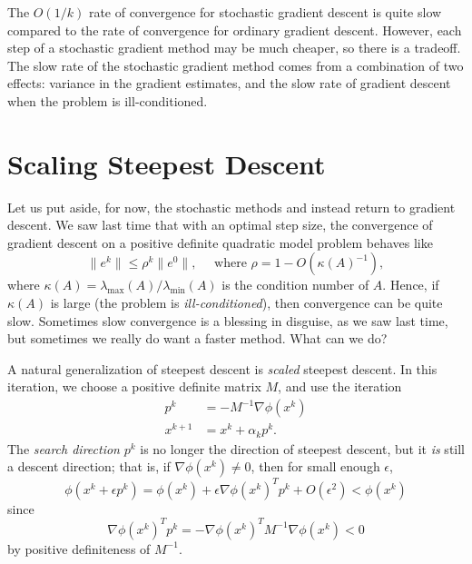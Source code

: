 \documentclass[12pt, leqno]{article} %
\begin{document}
The $O(1/k)$ rate of convergence for stochastic gradient descent is quite slow
compared to the rate of convergence for ordinary gradient descent.
However, each step of a stochastic gradient method may be much
cheaper, so there is a tradeoff.  The slow rate of the stochastic
gradient method comes from a combination of two effects: variance in
the gradient estimates, and the slow rate of gradient descent when the
problem is ill-conditioned.

\section{Scaling Steepest Descent}

Let us put aside, for now, the stochastic methods and instead
return to gradient descent.  We saw last time that with an optimal
step size, the convergence of gradient descent on a positive definite
quadratic model problem behaves like
\[
  \|e^k\| \leq \rho^k \|e^0\|, \quad \mbox{ where }
  \rho = 1 - O(\kappa(A)^{-1}),
\]
where $\kappa(A) = \lambda_{\max}(A)/\lambda_{\min}(A)$ is the
condition number of $A$.  Hence, if $\kappa(A)$ is large (the problem
is {\em ill-conditioned}), then convergence can be quite slow.
Sometimes slow convergence is a blessing in disguise, as we saw last
time, but sometimes we really do want a faster method.  What can we
do?

A natural generalization of steepest descent is {\em scaled} steepest
descent.  In this iteration, we choose a positive definite matrix $M$,
and use the iteration
\begin{align*}
  p^{k}   &= -M^{-1} \nabla \phi(x^k) \\
  x^{k+1} &= x^k + \alpha_k p^k.
\end{align*}
The {\em search direction} $p^k$ is no longer the direction of steepest
descent, but it {\em is} still a descent direction; that is, if
$\nabla \phi(x^k) \neq 0$, then for small enough $\epsilon$,
\[
  \phi(x^k + \epsilon p^k) =
  \phi(x^k) + \epsilon \nabla \phi(x^k)^T p^k + O(\epsilon^2) < \phi(x^k)
\]
since
\[
  \nabla \phi(x^k)^T p^k = -\nabla \phi(x^k)^T M^{-1} \nabla
  \phi(x^k) < 0
\]
by positive definiteness of $M^{-1}$.
\end{document}
